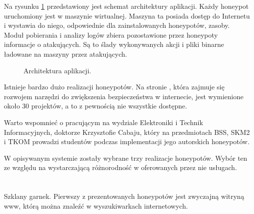 \documentclass[runningheads,a4paper]{llncs}
\begin{document}
Na rysunku \ref{fig:architektura_fig} przedstawiony jest schemat architektury aplikacji. Każdy honeypot uruchomiony jest w maszynie wirtualnej. Maszyna ta posiada dostęp do Internetu i wystawia do niego, odpowiednie dla zainstalowanych honeypotów, zasoby. Moduł pobierania i analizy logów zbiera pozostawione przez honeypoty informacje o atakujących. Są to ślady wykonywanych akcji i pliki binarne ładowane na maszyny przez atakujących.

\begin{figure}
        \centering
        \caption{Architektura aplikacji.}
        \label{fig:architektura_fig}
\end{figure}

Istnieje bardzo dużo realizacji honeypotów. Na stronie \cite{honeynet_project}, która zajmuje się rozwojem narzędzi do zwiększenia bezpieczeństwa w internecie, jest wymienione około 30 projektów, a to z pewnością nie wszystkie dostępne.

Warto wspomnieć o pracującym na wydziale Elektroniki i Technik Informacyjnych, doktorze Krzysztofie Cabaju, który na przedmiotach BSS, SKM2 i TKOM prowadzi studentów podczas implementacji jego autorskich honeypotów.

W opisywanym systemie zostały wybrane trzy realizacje honeypotów. Wybór ten  ze względu na wystarczającą różnorodność w oferowanych przez nie usługach.

\section{}

Szklany garnek. Pierwszy z prezentowanych honeypotów jest zwyczajną witryną www, którą można znaleźć w wyszukiwarkach internetowych.
\end{document}
